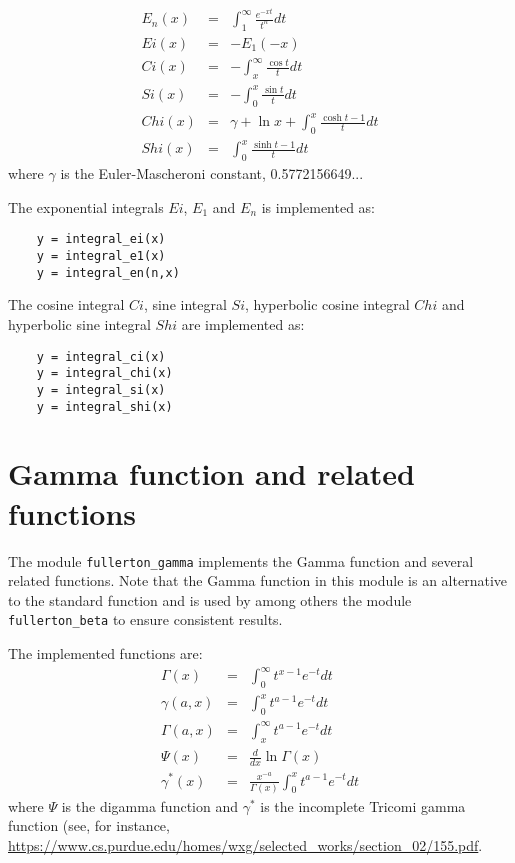 \documentclass{article}
\begin{document}
\begin{eqnarray}
    E_n(x) &=& \int^\infty_1 \frac{e^{-xt}}{t^n} dt              \\
    Ei(x)  &=& -E_1(-x)                                          \\
    Ci(x)  &=& -\int^\infty_x \frac{\cos t}{t} dt                \\
    Si(x)  &=& -\int^x_0 \frac{\sin t}{t} dt                     \\
    Chi(x) &=& \gamma + \ln x + \int^x_0 \frac{\cosh t -1}{t} dt \\
    Shi(x) &=& \int^x_0 \frac{\sinh t -1}{t} dt
\end{eqnarray}
\noindent where $\gamma$ is the Euler-Mascheroni constant, 0.5772156649...

The exponential integrals $Ei$, $E_1$ and $E_n$ is implemented as:

\begin{verbatim}
    y = integral_ei(x)
    y = integral_e1(x)
    y = integral_en(n,x)
\end{verbatim}

The cosine integral $Ci$, sine integral $Si$, hyperbolic cosine integral $Chi$ and
hyperbolic sine integral $Shi$ are implemented as:

\begin{verbatim}
    y = integral_ci(x)
    y = integral_chi(x)
    y = integral_si(x)
    y = integral_shi(x)
\end{verbatim}

\section{Gamma function and related functions}
The module \verb+fullerton_gamma+ implements the Gamma function and several related functions. Note that
the Gamma function in this module is an alternative to the standard function and is used by among others the
module \verb+fullerton_beta+ to ensure consistent results.

The implemented functions are:
\begin{eqnarray}
    \Gamma(x)   &=& \int^\infty_0 t^{x-1} e^{-t} dt \\
    \gamma(a,x) &=& \int^x_0 t^{a-1} e^{-t} dt      \\
    \Gamma(a,x) &=& \int^\infty_x t^{a-1} e^{-t} dt \\
    \Psi(x)     &=& \frac{d}{dx} \ln \Gamma(x)      \\
    \gamma^*(x) &=& \frac{x^{-a}}{\Gamma(x)} \int^x_0 t^{a-1} e^{-t} dt
\end{eqnarray}
\noindent where $\Psi$ is the digamma function and $\gamma^*$ is the incomplete Tricomi gamma function (see, for instance,
\url{https://www.cs.purdue.edu/homes/wxg/selected_works/section_02/155.pdf}.
\end{document}
